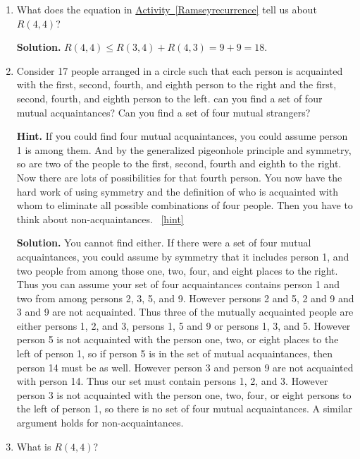 \documentclass{book}
\begin{document}
\setcounter{project}{53}
\addtocounter{project}{-1}
\begin{activity}[]\label{Ramseybound2}
\leavevmode%
\begin{enumerate}[font=\bfseries,label=(\alph*),ref=\alph*]
\item\label{task-61} \hypertarget{p-450}{}%
What does the equation in \hyperref[Ramseyrecurrence]{Activity~\ref{Ramseyrecurrence}} tell us about \(R(4,4)\)?%
\par\smallskip%
\noindent\textbf{Solution.}\hypertarget{solution-50}{}\quad%
\hypertarget{p-451}{}%
\(R(4,4)\le R(3,4) + R(4,3) =9+9 = 18\).%
\item\label{task-62} \hypertarget{p-452}{}%
Consider 17 people arranged in a circle such that each person is acquainted with the first, second, fourth, and eighth person to the right and the first, second, fourth, and eighth person to the left.  can you find a set of four mutual acquaintances?  Can you find a set of four mutual strangers?%
\par\smallskip%
\noindent\textbf{Hint.}\hypertarget{hint-23}{}\quad%
\hypertarget{p-453}{}%
If you could find four mutual acquaintances, you could assume person 1 is among them. And by the generalized pigeonhole principle and symmetry, so are two of the people to the first, second, fourth and eighth to the right. Now there are lots of possibilities for that fourth person. You now have the hard work of using symmetry and the definition of who is acquainted with whom to eliminate all possible combinations of four people. Then you have to think about non-acquaintances.%
~\hfill{\tiny\hyperlink{a-53.b}{[hint]}\hypertarget{q-53.b}{}}\par\smallskip%
\noindent\textbf{Solution.}\hypertarget{solution-51}{}\quad%
\hypertarget{p-454}{}%
You cannot find either. If there were a set of four mutual acquaintances, you could assume by symmetry that it includes person 1, and two people from among those one, two, four, and eight places to the right. Thus you can assume your set of four acquaintances contains person 1 and two from among persons 2, 3, 5, and 9. However persons 2 and 5, 2 and 9 and 3 and 9 are not acquainted. Thus three of the mutually acquainted people are either persons 1, 2, and 3, persons 1, 5 and 9 or persons 1, 3, and 5. However person 5 is not acquainted with the person one, two, or eight places to the left of person 1, so if person 5 is in the set of mutual acquaintances, then person 14 must be as well. However person 3 and person 9 are not acquainted with person 14. Thus our set must contain persons 1, 2, and 3. However person 3 is not acquainted with the person one, two, four, or eight persons to the left of person 1, so there is no set of four mutual acquaintances. A similar argument holds for non-acquaintances.%
\item\label{task-63} \hypertarget{p-455}{}%
What is \(R(4,4)\)?%
\end{enumerate}
\end{activity}
\end{document}
